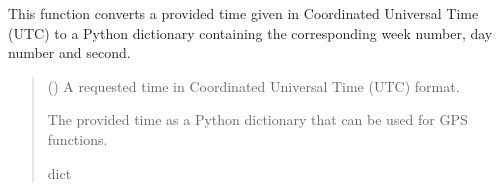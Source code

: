 \documentclass[letterpaper,10pt,english]{sphinxmanual}
\begin{document}
\begin{fulllineitems}
\label{\detokenize{modules/util/transformations:qnav.util.transformations.utc2gps}}
\pysigstartsignatures
{}
\pysigstopsignatures
\sphinxAtStartPar
This function converts a provided time given in Coordinated Universal Time
(UTC) to a Python dictionary containing the corresponding week number, day
number and second.
\begin{quote}\begin{description}
\sphinxAtStartPar
{} () \textendash{} A requested time in Coordinated Universal Time (UTC) format.

\sphinxAtStartPar
The provided time as a Python dictionary that can be used for
GPS functions.

\sphinxAtStartPar
dict

\end{description}\end{quote}

\end{fulllineitems}

\end{document}
